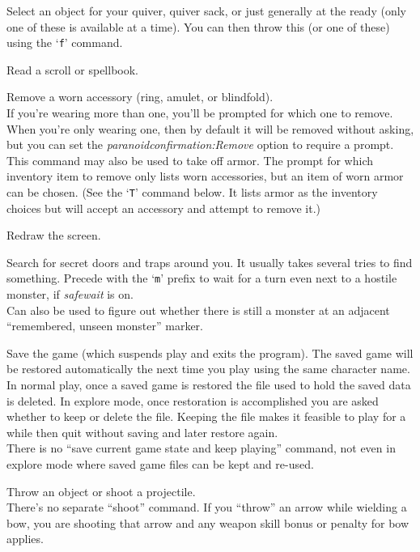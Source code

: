 \documentclass[titlepage]{article}
\begin{document}
\begin{description}[font=\mdseries\ttfamily]
Select an object for your quiver, quiver sack, or just generally at
the ready (only one of these is available at a time).  You can then throw
this (or one of these) using the `\texttt{f}' command.
\item[r]
Read a scroll or spellbook.
\item[R]
Remove a worn accessory (ring, amulet, or blindfold).\\
If you're wearing more than one, you'll be prompted for which one to
remove.  When you're only wearing one, then by default it will be removed
without asking, but you can set the
\textit{paranoid\textunderscore confirmation:Remove}
option to require a prompt.\\
This command may also be used to take off armor.  The prompt for which
inventory item to remove only lists worn accessories, but an item of
worn armor can be chosen.
(See the `\texttt{T}' command below.  It lists armor as the inventory
choices but will accept an accessory and attempt to remove it.)
\item[\textasciicircum R]
Redraw the screen.
\item[s]
Search for secret doors and traps around you.
It usually takes several tries to find something.
Precede with the `\texttt{m}' prefix to wait for a turn
even next to a hostile monster, if \textit{safe\textunderscore wait}
is on.\\
Can also be used to figure out whether there is still a monster at
an adjacent ``remembered, unseen monster'' marker.
\item[S]
Save the game (which suspends play and exits the program).
The saved game will be restored automatically the next time you play
using the same character name.\\
In normal play, once a saved game is restored the file used to hold
the saved data is deleted.
In explore mode, once restoration is accomplished you are asked whether
to keep or delete the file.
Keeping the file makes it feasible to play for a while then quit
without saving and later restore again.\\
There is no ``save current game state and keep playing'' command, not
even in explore mode where saved game files can be kept and re-used.
\item[t]
Throw an object or shoot a projectile.\\
There's no separate ``shoot'' command.
If you ``throw'' an arrow while wielding a bow, you are shooting
that arrow and any weapon skill bonus or penalty for bow applies.

\end{description}
\end{document}
